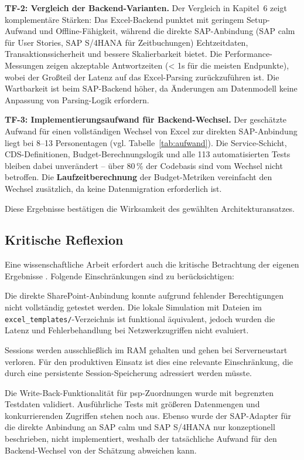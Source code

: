 \textbf{TF-2: Vergleich der Backend-Varianten.} Der Vergleich in Kapitel~6 zeigt komplementäre Stärken: Das Excel-Backend punktet mit geringem Setup-Aufwand und Offline-Fähigkeit, während die direkte SAP-Anbindung (SAP \gls{calm} für User Stories, SAP S/4HANA für Zeitbuchungen) Echtzeitdaten, Transaktionssicherheit und bessere Skalierbarkeit bietet. Die Performance-Messungen zeigen akzeptable Antwortzeiten (< 1s für die meisten Endpunkte), wobei der Großteil der Latenz auf das Excel-Parsing zurückzuführen ist. Die Wartbarkeit ist beim SAP-Backend höher, da Änderungen am Datenmodell keine Anpassung von Parsing-Logik erfordern.

\textbf{TF-3: Implementierungsaufwand für Backend-Wechsel.} Der geschätzte Aufwand für einen vollständigen Wechsel von Excel zur direkten SAP-Anbindung liegt bei 8--13 Personentagen (vgl. Tabelle~\ref{tab:aufwand}). Die Service-Schicht, CDS-Definitionen, Budget-Berechnungslogik und alle 113 automatisierten Tests bleiben dabei unverändert -- über 80\,\% der Codebasis sind vom Wechsel nicht betroffen. Die \textbf{Laufzeitberechnung} der Budget-Metriken vereinfacht den Wechsel zusätzlich, da keine Datenmigration erforderlich ist.

Diese Ergebnisse bestätigen die Wirksamkeit des gewählten Architekturansatzes.

\subsection{Kritische Reflexion}

Eine wissenschaftliche Arbeit erfordert auch die kritische Betrachtung der eigenen Ergebnisse \citep{wohlin2012}. Folgende Einschränkungen sind zu berücksichtigen:

Die direkte SharePoint-Anbindung konnte aufgrund fehlender Berechtigungen nicht vollständig getestet werden. Die lokale Simulation mit Dateien im \texttt{excel\_templates/}-Verzeichnis ist funktional äquivalent, jedoch wurden die Latenz und Fehlerbehandlung bei Netzwerkzugriffen nicht evaluiert.

Sessions werden ausschließlich im RAM gehalten und gehen bei Serverneustart verloren. Für den produktiven Einsatz ist dies eine relevante Einschränkung, die durch eine persistente Session-Speicherung adressiert werden müsste.

Die Write-Back-Funktionalität für \gls{psp}-Zuordnungen wurde mit begrenzten Testdaten validiert. Ausführliche Tests mit größeren Datenmengen und konkurrierenden Zugriffen stehen noch aus. Ebenso wurde der SAP-Adapter für die direkte Anbindung an SAP \gls{calm} und SAP S/4HANA nur konzeptionell beschrieben, nicht implementiert, weshalb der tatsächliche Aufwand für den Backend-Wechsel von der Schätzung abweichen kann.

